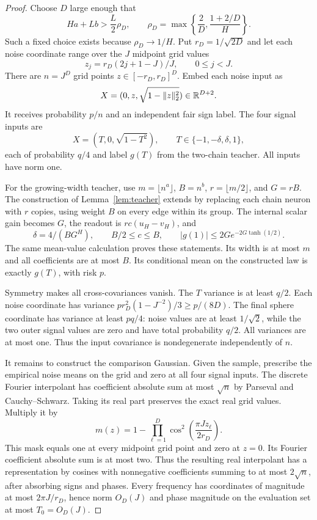 \begin{proof}
Choose $D$ large enough that
\begin{equation}
 Ha+Lb>\frac L2\rho_D,
 \qquad
 \rho_D=\max\left\{\frac2D,\frac{1+2/D}{H}\right\}.
 \label{eq:fixed-slack}
\end{equation}
Such a fixed choice exists because $\rho_D\to1/H$. Put $r_D=1/\sqrt{2D}$ and let each noise coordinate range over the $J$ midpoint grid values
\[
 z_j=r_D(2j+1-J)/J,\qquad 0\le j<J.
\]
There are $n=J^D$ grid points $z\in[-r_D,r_D]^D$. Embed each noise input as
\[
 X=(0,z,\sqrt{1-\|z\|_2^2})\in\mathbb R^{D+2}.
\]
It receives probability $p/n$ and an independent fair sign label. The four signal inputs are
\[
 X=(T,0,\sqrt{1-T^2}),\qquad T\in\{-1,-\delta,\delta,1\},
\]
each of probability $q/4$ and label $g(T)$ from the two-chain teacher. All inputs have norm one.

For the growing-width teacher, use $m=\lfloor n^a\rfloor$, $B=n^b$, $r=\lfloor m/2\rfloor$, and $G=rB$. The construction of Lemma~\ref{lem:teacher} extends by replacing each chain neuron with $r$ copies, using weight $B$ on every edge within its group. The internal scalar gain becomes $G$, the readout is $rc(u_H-v_H)$, and
\[
 \delta=4/(BG^H),\qquad B/2\le c\le B,
 \qquad |g(1)|\le2G e^{-2G\tanh(1/2)}.
\]
The same mean-value calculation proves these statements. Its width is at most $m$ and all coefficients are at most $B$. Its conditional mean on the constructed law is exactly $g(T)$, with risk $p$.

Symmetry makes all cross-covariances vanish. The $T$ variance is at least $q/2$. Each noise coordinate has variance
$p r_D^2(1-J^{-2})/3\ge p/(8D)$. The final sphere coordinate has variance at least $pq/4$: noise values are at least $1/\sqrt2$, while the two outer signal values are zero and have total probability $q/2$. All variances are at most one. Thus the input covariance is nondegenerate independently of $n$.

It remains to construct the comparison Gaussian. Given the sample, prescribe the empirical noise means on the grid and zero at all four signal inputs. The discrete Fourier interpolant has coefficient absolute sum at most $\sqrt n$ by Parseval and Cauchy--Schwarz. Taking its real part preserves the exact real grid values. Multiply it by
\[
 m(z)=1-\prod_{\ell=1}^D\cos^2\left(\frac{\pi Jz_\ell}{2r_D}\right).
\]
This mask equals one at every midpoint grid point and zero at $z=0$. Its Fourier coefficient absolute sum is at most two. Thus the resulting real interpolant has a representation by cosines with nonnegative coefficients summing to at most $2\sqrt n$, after absorbing signs and phases. Every frequency has coordinates of magnitude at most $2\pi J/r_D$, hence norm $O_D(J)$ and phase magnitude on the evaluation set at most $T_0=O_D(J)$.


\end{proof}
